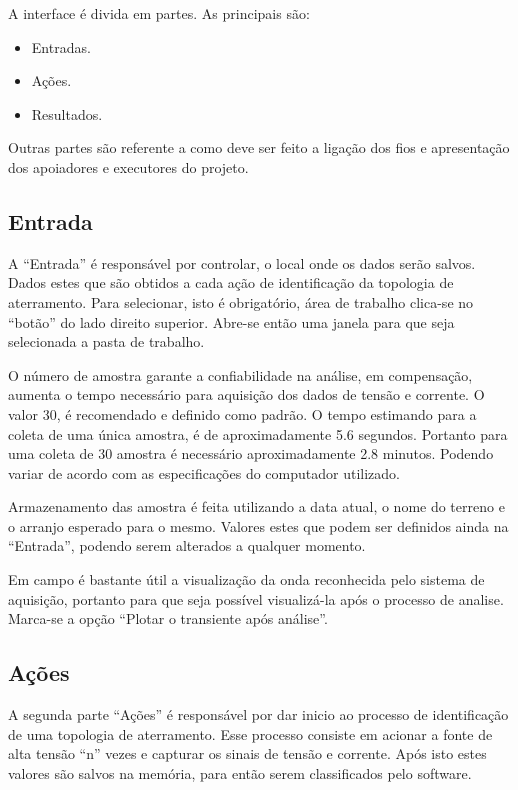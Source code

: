 \documentclass[a4paper, 10pt]{article}
\begin{document}
A interface é divida em partes. As principais são:

\begin{itemize}
    \item Entradas.
    \item Ações.
    \item Resultados.
\end{itemize}

Outras partes são referente a como deve ser feito a ligação dos fios e apresentação dos
apoiadores e executores do projeto.

\subsection{Entrada}

A ``Entrada'' é responsável por controlar, o local onde os dados serão salvos. Dados estes que são
obtidos a cada ação de identificação da topologia de aterramento. Para selecionar, isto é obrigatório, 
área de trabalho clica-se no ``botão'' do lado direito superior. Abre-se então uma janela para 
que seja selecionada a pasta de trabalho. 

O número de amostra garante a confiabilidade na análise, em
compensação, aumenta o tempo necessário para aquisição dos dados de tensão e corrente. O valor 30, 
é recomendado e definido como padrão. 
O tempo estimando para a coleta de uma única amostra, é de aproximadamente 5.6 segundos. 
Portanto para uma coleta de 30 amostra é necessário aproximadamente 2.8 minutos. Podendo variar de 
acordo com as especificações do computador utilizado.

Armazenamento das amostra é feita utilizando a data atual, o nome do terreno e o arranjo esperado para 
o mesmo. Valores estes que podem ser definidos ainda na ``Entrada'', podendo serem alterados a qualquer
momento. 

Em campo é bastante útil a visualização da onda reconhecida pelo sistema de aquisição, portanto para 
que seja possível visualizá-la após o processo de analise. Marca-se a opção ``Plotar o transiente 
após análise''.

\subsection{Ações}

A segunda parte ``Ações'' é responsável por dar inicio ao processo de identificação de uma topologia
de aterramento. Esse processo consiste em acionar a fonte de alta tensão ``n'' vezes e capturar 
os sinais de tensão e corrente. Após isto estes valores são salvos na memória, para então serem 
classificados pelo software.
\end{document}
